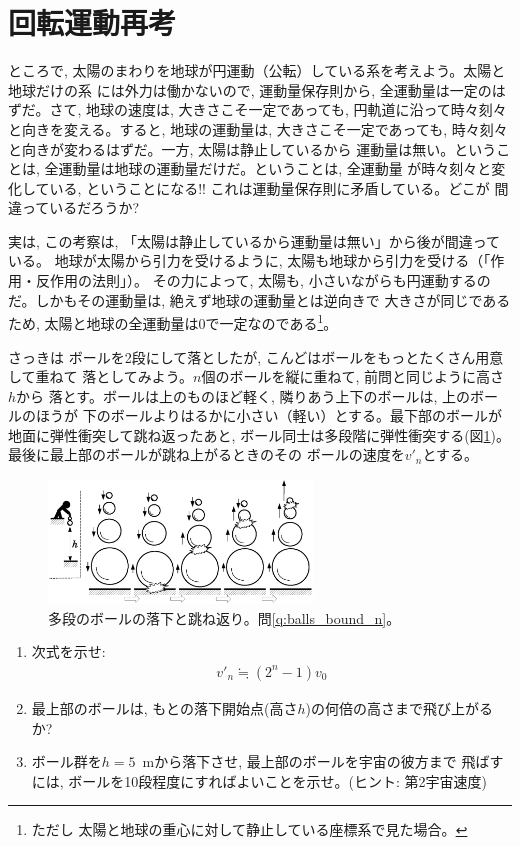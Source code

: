 \section{回転運動再考}

ところで, 太陽のまわりを地球が円運動（公転）している系を考えよう。太陽と地球だけの系
には外力は働かないので, 運動量保存則から, 全運動量は一定のはずだ。さて, 地球の速度は, 
大きさこそ一定であっても, 円軌道に沿って時々刻々と向きを変える。すると, 地球の運動量は, 
大きさこそ一定であっても, 時々刻々と向きが変わるはずだ。一方, 太陽は静止しているから
運動量は無い。ということは, 全運動量は地球の運動量だけだ。ということは, 全運動量
が時々刻々と変化している, ということになる!! これは運動量保存則に矛盾している。どこが
間違っているだろうか?

実は, この考察は, 「太陽は静止しているから運動量は無い」から後が間違っている。
地球が太陽から引力を受けるように, 太陽も地球から引力を受ける（「作用・反作用の法則」）。
その力によって, 太陽も, 小さいながらも円運動するのだ。しかもその運動量は, 絶えず地球の運動量とは逆向きで
大きさが同じであるため, 太陽と地球の全運動量は0で一定なのである\footnote{ただし
太陽と地球の重心に対して静止している座標系で見た場合。}。
\hv



\begin{exq}\label{q:balls_bound_n} さっきは
ボールを2段にして落としたが, こんどはボールをもっとたくさん用意して重ねて
落としてみよう。$n$個のボールを縦に重ねて, 前問と同じように高さ$h$から
落とす。ボールは上のものほど軽く, 隣りあう上下のボールは, 上のボールのほうが
下のボールよりはるかに小さい（軽い）とする。最下部のボールが地面に弾性衝突して跳ね返ったあと, 
ボール同士は多段階に弾性衝突する(図\ref{fig:balls_bound_n})。最後に最上部のボールが跳ね上がるときのその
ボールの速度を$v'_n$とする。

\begin{figure}[h]
    \centering
    \includegraphics[width=7cm]{balls_bound_n.eps}
    \caption{多段のボールの落下と跳ね返り。問\ref{q:balls_bound_n}。}\label{fig:balls_bound_n}
\end{figure}

\begin{enumerate}
\item 次式を示せ:
\begin{eqnarray}
v'_n\fallingdotseq (2^n-1)v_0\label{eq:balls_bound_n3}
\end{eqnarray}
\item 最上部のボールは, もとの落下開始点(高さ$h$)の何倍の高さまで飛び上がるか?
\item ボール群を$h=5$~mから落下させ, 最上部のボールを宇宙の彼方まで
飛ばすには, ボールを10段程度にすればよいことを示せ。(ヒント: 第2宇宙速度)
\end{enumerate}
\end{exq}

